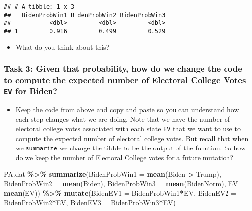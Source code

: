 \documentclass[
]{article}
\newenvironment{Shaded}{\begin{snugshade}}{\end{snugshade}}
\newcommand{\AttributeTok}[1]{\textcolor[rgb]{0.13,0.29,0.53}{#1}}
\newcommand{\FunctionTok}[1]{\textcolor[rgb]{0.13,0.29,0.53}{\textbf{#1}}}
\newcommand{\NormalTok}[1]{#1}
\newcommand{\SpecialCharTok}[1]{\textcolor[rgb]{0.81,0.36,0.00}{\textbf{#1}}}
\providecommand{\tightlist}{%
  \setlength{\itemsep}{0pt}\setlength{\parskip}{0pt}}
\begin{document}
\begin{verbatim}
## # A tibble: 1 x 3
##   BidenProbWin1 BidenProbWin2 BidenProbWin3
##           <dbl>         <dbl>         <dbl>
## 1         0.916         0.499         0.529
\end{verbatim}

\begin{itemize}
\tightlist
\item
  What do you think about this?
\end{itemize}

\subsubsection{\texorpdfstring{Task 3: Given that probability, how do we
change the code to compute the expected number of Electoral College
Votes \texttt{EV} for
Biden?}{Task 3: Given that probability, how do we change the code to compute the expected number of Electoral College Votes EV for Biden?}}\label{task-3-given-that-probability-how-do-we-change-the-code-to-compute-the-expected-number-of-electoral-college-votes-ev-for-biden}

\begin{itemize}
\tightlist
\item
  Keep the code from above and copy and paste so you can understand how
  each step changes what we are doing. Note that we have the number of
  electoral college votes associated with each state \texttt{EV} that we
  want to use to compute the expected number of electoral college votes.
  But recall that when we \texttt{summarize} we change the tibble to be
  the output of the function. So how do we keep the number of Electoral
  College votes for a future mutation?
\end{itemize}

\begin{Shaded}
\begin{Highlighting}[]
\NormalTok{PA.dat }\SpecialCharTok{\%\textgreater{}\%}
      \FunctionTok{summarize}\NormalTok{(}\AttributeTok{BidenProbWin1 =} \FunctionTok{mean}\NormalTok{(Biden }\SpecialCharTok{\textgreater{}}\NormalTok{ Trump),}
                \AttributeTok{BidenProbWin2 =} \FunctionTok{mean}\NormalTok{(Biden),}
                \AttributeTok{BidenProbWin3 =} \FunctionTok{mean}\NormalTok{(BidenNorm),}
                \AttributeTok{EV =} \FunctionTok{mean}\NormalTok{(EV)) }\SpecialCharTok{\%\textgreater{}\%}
      \FunctionTok{mutate}\NormalTok{(}\AttributeTok{BidenEV1 =}\NormalTok{ BidenProbWin1}\SpecialCharTok{*}\NormalTok{EV,}
             \AttributeTok{BidenEV2 =}\NormalTok{ BidenProbWin2}\SpecialCharTok{*}\NormalTok{EV,}
             \AttributeTok{BidenEV3 =}\NormalTok{ BidenProbWin3}\SpecialCharTok{*}\NormalTok{EV)}
\end{Highlighting}
\end{Shaded}
\end{document}
